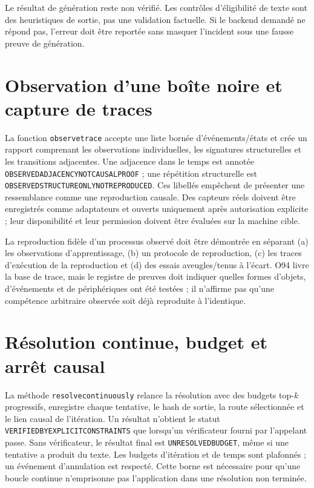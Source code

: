 \documentclass[11pt,a4paper]{article}
\begin{document}
Le résultat de génération reste non vérifié. Les contrôles d'éligibilité de texte sont des heuristiques de sortie, pas une validation factuelle. Si le backend demandé ne répond pas, l'erreur doit être reportée sans masquer l'incident sous une fausse preuve de génération.

\section{Observation d'une boîte noire et capture de traces}
La fonction \texttt{observe\textunderscore trace} accepte une liste bornée d'événements/états et crée un rapport comprenant les observations individuelles, les signatures structurelles et les transitions adjacentes. Une adjacence dans le temps est annotée \texttt{OBSERVED\textunderscore ADJACENCY\textunderscore NOT\textunderscore CAUSAL\textunderscore PROOF} ; une répétition structurelle est \texttt{OBSERVED\textunderscore STRUCTURE\textunderscore ONLY\textunderscore NOT\textunderscore REPRODUCED}. Ces libellés empêchent de présenter une ressemblance comme une reproduction causale. Des capteurs réels doivent être enregistrés comme adaptateurs et ouverts uniquement après autorisation explicite ; leur disponibilité et leur permission doivent être évaluées sur la machine cible.

La reproduction fidèle d'un processus observé doit être démontrée en séparant (a) les observations d'apprentissage, (b) un protocole de reproduction, (c) les traces d'exécution de la reproduction et (d) des essais aveugles/tenus à l'écart. O94 livre la base de trace, mais le registre de preuves doit indiquer quelles formes d'objets, d'événements et de périphériques ont été testées ; il n'affirme pas qu'une compétence arbitraire observée soit déjà reproduite à l'identique.

\section{Résolution continue, budget et arrêt causal}
La méthode \texttt{resolve\textunderscore continuously} relance la résolution avec des budgets top-$k$ progressifs, enregistre chaque tentative, le hash de sortie, la route sélectionnée et le lien causal de l'itération. Un résultat n'obtient le statut \texttt{VERIFIED\textunderscore BY\textunderscore EXPLICIT\textunderscore CONSTRAINTS} que lorsqu'un vérificateur fourni par l'appelant passe. Sans vérificateur, le résultat final est \texttt{UNRESOLVED\textunderscore BUDGET}, même si une tentative a produit du texte. Les budgets d'itération et de temps sont plafonnés ; un événement d'annulation est respecté. Cette borne est nécessaire pour qu'une boucle continue n'emprisonne pas l'application dans une résolution non terminée.
\end{document}
